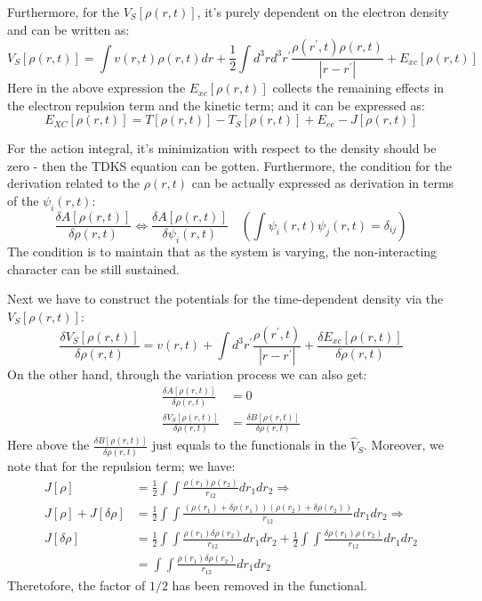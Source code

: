 Furthermore, for the $V_{S}[\rho(r,t)]$, it's purely dependent on
the electron density and can be written as:
\begin{equation}\label{}
V_{S}[\rho(r,t)] = \int v(r,t)\rho(r, t)dr + \frac{1}{2}\int
d^{3}rd^{3}r^{'}\frac{\rho(r^{'}, t)\rho(r, t)}{|r-r^{'}|} +
E_{xc}[\rho(r,t)]
\end{equation}
Here in the above expression the $E_{xc}[\rho(r,t)]$ collects the
remaining effects in the electron repulsion term and the kinetic
term; and it can be expressed as:
\begin{equation}\label{}
E_{XC}[\rho(r,t)] = T[\rho(r,t)]- T_{S}[\rho(r,t)] + E_{ee} -
J[\rho(r,t)]
\end{equation}

For the action integral, it's minimization with respect to the
density should be zero - then the TDKS equation can be gotten.
Furthermore, the condition for the derivation related to the
$\rho(r,t)$ can be actually expressed as derivation in terms of the
$\psi_{i}(r,t)$:
\begin{equation}\label{TDDFTeq:57}
\frac{\delta A[\rho(r,t)]}{\delta\rho(r,t)} \Leftrightarrow
\frac{\delta A[\rho(r,t)]}{\delta\psi_{i}(r,t)} \quad
\left(\int\psi_{i}(r,t)\psi_{j}(r,t) = \delta_{ij}\right)
\end{equation}
The condition is to maintain that as the system is varying, the
non-interacting character can be still sustained.

Next we have to construct the potentials for the time-dependent
density via the $V_{S}[\rho(r,t)]$:
\begin{equation}\label{}
\frac{\delta V_{S}[\rho(r,t)]}{\delta\rho(r,t)} = v(r,t) + \int
d^{3}r^{'}\frac{\rho(r^{'}, t)}{|r-r^{'}|} + \frac{\delta
E_{xc}[\rho(r,t)]}{\delta\rho(r,t)}
\end{equation}
On the other hand, through the variation process we can also get:
\begin{align}\label{}
\frac{\delta A[\rho(r,t)]}{\delta\rho(r,t)} &= 0 \nonumber \\
\frac{\delta V_{S}[\rho(r,t)]}{\delta\rho(r,t)} &= \frac{\delta
B[\rho(r,t)]}{\delta\rho(r,t)}
\end{align}
Here above the $\frac{\delta B[\rho(r,t)]}{\delta\rho(r,t)}$ just
equals to the functionals in the $\hat{V}_{S}$. Moreover, we note
that for the repulsion term; we have:
\begin{align}\label{}
J[\rho] &=
\frac{1}{2}\int\int\frac{\rho(r_{1})\rho(r_{2})}{r_{12}}dr_{1}dr_{2}
\Rightarrow \nonumber \\
J[\rho] + J[\delta\rho] &= \frac{1}{2}\int\int\frac{(\rho(r_{1}) +
\delta\rho(r_{1}))(\rho(r_{2}) +
\delta\rho(r_{2}))}{r_{12}}dr_{1}dr_{2} \Rightarrow \nonumber \\
J[\delta\rho] &= \frac{1}{2}\int\int\frac{\rho(r_{1})
\delta\rho(r_{2})}{r_{12}}dr_{1}dr_{2} +
\frac{1}{2}\int\int\frac{\delta\rho(r_{1})\rho(r_{2})}{r_{12}}dr_{1}
dr_{2} \nonumber \\
&=\int\int\frac{\rho(r_{1})\delta\rho(r_{2})}{r_{12}}dr_{1}dr_{2}
\end{align}
Theretofore, the factor of $1/2$ has been removed in the functional.

